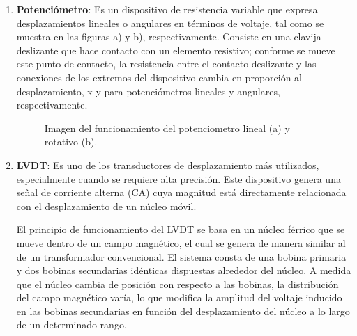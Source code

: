 \begin{enumerate}
\begin{enumerate}
\begin{enumerate}
		     
					\item \textbf{Potenciómetro}: Es un dispositivo de resistencia variable que expresa desplazamientos lineales o angulares en términos de voltaje, tal como se muestra en las figuras a) y b), respectivamente. Consiste en una clavija deslizante que hace contacto con un elemento resistivo; conforme se mueve este punto de contacto, la resistencia entre el contacto deslizante y las conexiones de los extremos del dispositivo cambia en proporción al desplazamiento, x y  para potenciómetros lineales
					y angulares, respectivamente. \cite{saha2010robotics}
					
				\begin{figure}[h]
					\centering
					\hfill
					\caption{Imagen del funcionamiento del potenciometro lineal (a) y rotativo (b).}
					\label{fig:Potenciometro}
				\end{figure}

\vspace{10mm}
			\item \textbf{LVDT}: Es uno de los transductores de desplazamiento más utilizados, especialmente cuando se requiere alta precisión. Este dispositivo genera una señal de corriente alterna (CA) cuya magnitud está directamente relacionada con el desplazamiento de un núcleo móvil.
		
		El principio de funcionamiento del LVDT se basa en un núcleo férrico que se mueve dentro de un campo magnético, el cual se genera de manera similar al de un transformador convencional. El sistema consta de una bobina primaria y dos bobinas secundarias idénticas dispuestas alrededor del núcleo. A medida que el núcleo cambia de posición con respecto a las bobinas, la distribución del campo magnético varía, lo que modifica la amplitud del voltaje inducido en las bobinas secundarias en función del desplazamiento del núcleo a lo largo de un determinado rango.\cite{saha2010robotics}
		\\
		

\end{enumerate}
\end{enumerate}
\end{enumerate}
